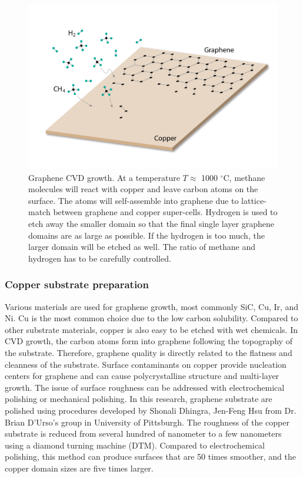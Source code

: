 \documentclass[pdflatex, sectionletters, 12pt]{pittetd}    %
\begin{document}
\begin{figure}[h!]
	\centering
	\includegraphics[width=.80\textwidth]{Drawing/CVD.pdf}
	\caption{Graphene CVD growth. At a temperature $T \approx$ 1000 $^{\circ}$C, methane molecules will react with copper and leave carbon atoms on the surface. The atoms will self-assemble into graphene due to lattice-match between graphene and copper super-cells. Hydrogen is used to etch away the smaller domain so that the final single layer graphene domains are as large as possible. If the hydrogen is too much, the larger domain will be etched as well. The ratio of methane and hydrogen has to be carefully controlled.}
	\label{FIG:CVD}
\end{figure}

\subsubsection{Copper substrate preparation}

Various materials are used for graphene growth, most commonly SiC, Cu, Ir, and Ni. Cu is the most common choice due to the low carbon solubility\cite{Bae2010}. Compared to other substrate materials, copper is also easy to be etched with wet chemicals. In CVD growth, the carbon atoms form into graphene following the topography of the substrate. Therefore, graphene quality is directly related to the flatness and cleanness of the substrate. Surface contaminants on copper provide nucleation centers for graphene and can cause polycrystalline structure and multi-layer growth\cite{eres2014cooperative}. The issue of surface roughness can be addressed with electrochemical polishing\cite{Bae2010} or mechanical polishing. In this research, graphene substrate are polished using procedures developed by Shonali Dhingra, Jen-Feng Hsu from Dr. Brian D'Urso's group in University of Pittsburgh. The roughness of the copper substrate is reduced from several hundred of nanometer to a few nanometers\cite{dhingra2015quadratic} using a diamond turning machine (DTM). Compared to electrochemical polishing, this method can produce surfaces that are 50 times smoother, and the copper domain sizes are five times larger\cite{dhingra2014chemical}. 
\end{document}

